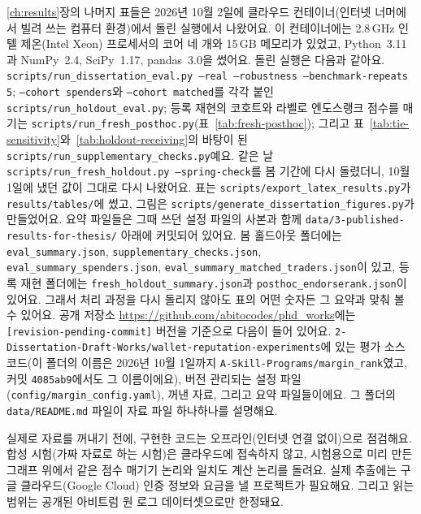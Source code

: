 \ref{ch:results}장의 나머지 표들은 2026년 10월 2일에 클라우드 컨테이너(인터넷 너머에서 빌려 쓰는 컴퓨터 환경)에서 돌린 실행에서 나왔어요. 이 컨테이너에는 2.8\,GHz 인텔 제온(Intel Xeon) 프로세서의 코어 네 개와 15\,GB 메모리가 있었고, Python~3.11과 NumPy~2.4, SciPy~1.17, pandas~3.0을 썼어요. 돌린 실행은 다음과 같아요. \texttt{scripts/run\_dissertation\_eval.py --real --robustness --benchmark-repeats 5}; \texttt{--cohort spenders}와 \texttt{--cohort matched}를 각각 붙인 \texttt{scripts/run\_holdout\_eval.py}; 등록 재현의 코호트와 라벨로 엔도스랭크 점수를 매기는 \texttt{scripts/run\_fresh\_posthoc.py}(표~\ref{tab:fresh-posthoc}); 그리고 표~\ref{tab:tie-sensitivity}와~\ref{tab:holdout-receiving}의 바탕이 된 \texttt{scripts/run\_supplementary\_checks.py}예요. 같은 날 \texttt{scripts/run\_fresh\_holdout.py --spring-check}를 봄 기간에 다시 돌렸더니, 10월 1일에 냈던 값이 그대로 다시 나왔어요. 표는 \texttt{scripts/export\_latex\_results.py}가 \texttt{results/tables/}에 썼고, 그림은 \texttt{scripts/generate\_dissertation\_figures.py}가 만들었어요. 요약 파일들은 그때 쓰던 설정 파일의 사본과 함께 \texttt{data/3-published-results-for-thesis/} 아래에 커밋되어 있어요. 봄 홀드아웃 폴더에는 \texttt{eval\_summary.json}, \texttt{supplementary\_checks.json}, \texttt{eval\_summary\_spenders.json}, \texttt{eval\_summary\_matched\_traders.json}이 있고, 등록 재현 폴더에는 \texttt{fresh\_holdout\_summary.json}과 \texttt{posthoc\_endorserank.json}이 있어요. 그래서 처리 과정을 다시 돌리지 않아도 표의 어떤 숫자든 그 요약과 맞춰 볼 수 있어요. 공개 저장소 \url{https://github.com/abitocodes/phd_works}에는 \texttt{[revision-pending-commit]} 버전을 기준으로 다음이 들어 있어요. \texttt{2-Dissertation-Draft-Works/wallet-reputation-experiments}에 있는 평가 소스 코드(이 폴더의 이름은 2026년 10월 1일까지 \texttt{A-Skill-Programs/margin\_rank}였고, 커밋 \texttt{4085ab9}에서도 그 이름이에요), 버전 관리되는 설정 파일(\texttt{config/margin\_config.yaml}), 꺼낸 자료, 그리고 요약 파일들이에요. 그 폴더의 \texttt{data/README.md} 파일이 자료 파일 하나하나를 설명해요.

실제로 자료를 꺼내기 전에, 구현한 코드는 오프라인(인터넷 연결 없이)으로 점검해요. 합성 시험(가짜 자료로 하는 시험)은 클라우드에 접속하지 않고, 시험용으로 미리 만든 그래프 위에서 같은 점수 매기기 논리와 일치도 계산 논리를 돌려요. 실제 추출에는 구글 클라우드(Google Cloud) 인증 정보와 요금을 낼 프로젝트가 필요해요. 그리고 읽는 범위는 공개된 아비트럼 원 로그 데이터셋으로만 한정돼요.


